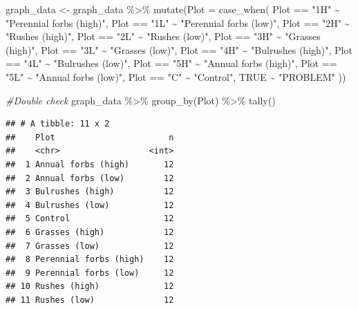 \documentclass[
]{book}
\newenvironment{Shaded}{\begin{snugshade}}{\end{snugshade}}
\newcommand{\AttributeTok}[1]{\textcolor[rgb]{0.77,0.63,0.00}{#1}}
\newcommand{\CommentTok}[1]{\textcolor[rgb]{0.56,0.35,0.01}{\textit{#1}}}
\newcommand{\ConstantTok}[1]{\textcolor[rgb]{0.00,0.00,0.00}{#1}}
\newcommand{\FunctionTok}[1]{\textcolor[rgb]{0.00,0.00,0.00}{#1}}
\newcommand{\NormalTok}[1]{#1}
\newcommand{\OtherTok}[1]{\textcolor[rgb]{0.56,0.35,0.01}{#1}}
\newcommand{\SpecialCharTok}[1]{\textcolor[rgb]{0.00,0.00,0.00}{#1}}
\newcommand{\StringTok}[1]{\textcolor[rgb]{0.31,0.60,0.02}{#1}}
\begin{document}
\begin{Shaded}
\begin{Highlighting}[]
\NormalTok{graph\_data }\OtherTok{\textless{}{-}}\NormalTok{ graph\_data }\SpecialCharTok{\%\textgreater{}\%} 
  \FunctionTok{mutate}\NormalTok{(}\AttributeTok{Plot =} \FunctionTok{case\_when}\NormalTok{(}
\NormalTok{    Plot }\SpecialCharTok{==} \StringTok{"1H"} \SpecialCharTok{\textasciitilde{}} \StringTok{"Perennial forbs (high)"}\NormalTok{,}
\NormalTok{    Plot }\SpecialCharTok{==} \StringTok{"1L"} \SpecialCharTok{\textasciitilde{}} \StringTok{"Perennial forbs (low)"}\NormalTok{,}
\NormalTok{    Plot }\SpecialCharTok{==} \StringTok{"2H"} \SpecialCharTok{\textasciitilde{}} \StringTok{"Rushes (high)"}\NormalTok{,}
\NormalTok{    Plot }\SpecialCharTok{==} \StringTok{"2L"} \SpecialCharTok{\textasciitilde{}} \StringTok{"Rushes (low)"}\NormalTok{,}
\NormalTok{    Plot }\SpecialCharTok{==} \StringTok{"3H"} \SpecialCharTok{\textasciitilde{}} \StringTok{"Grasses (high)"}\NormalTok{,}
\NormalTok{    Plot }\SpecialCharTok{==} \StringTok{"3L"} \SpecialCharTok{\textasciitilde{}} \StringTok{"Grasses (low)"}\NormalTok{,}
\NormalTok{    Plot }\SpecialCharTok{==} \StringTok{"4H"} \SpecialCharTok{\textasciitilde{}} \StringTok{"Bulrushes (high)"}\NormalTok{,}
\NormalTok{    Plot }\SpecialCharTok{==} \StringTok{"4L"} \SpecialCharTok{\textasciitilde{}} \StringTok{"Bulrushes (low)"}\NormalTok{,}
\NormalTok{    Plot }\SpecialCharTok{==} \StringTok{"5H"} \SpecialCharTok{\textasciitilde{}} \StringTok{"Annual forbs (high)"}\NormalTok{,}
\NormalTok{    Plot }\SpecialCharTok{==} \StringTok{"5L"} \SpecialCharTok{\textasciitilde{}} \StringTok{"Annual forbs (low)"}\NormalTok{,}
\NormalTok{    Plot }\SpecialCharTok{==} \StringTok{"C"} \SpecialCharTok{\textasciitilde{}} \StringTok{"Control"}\NormalTok{,}
    \ConstantTok{TRUE} \SpecialCharTok{\textasciitilde{}} \StringTok{"PROBLEM"}
\NormalTok{  ))}

\CommentTok{\#Double check}
\NormalTok{graph\_data }\SpecialCharTok{\%\textgreater{}\%} 
  \FunctionTok{group\_by}\NormalTok{(Plot) }\SpecialCharTok{\%\textgreater{}\%} 
  \FunctionTok{tally}\NormalTok{()}
\end{Highlighting}
\end{Shaded}

\begin{verbatim}
## # A tibble: 11 x 2
##    Plot                       n
##    <chr>                  <int>
##  1 Annual forbs (high)       12
##  2 Annual forbs (low)        12
##  3 Bulrushes (high)          12
##  4 Bulrushes (low)           12
##  5 Control                   12
##  6 Grasses (high)            12
##  7 Grasses (low)             12
##  8 Perennial forbs (high)    12
##  9 Perennial forbs (low)     12
## 10 Rushes (high)             12
## 11 Rushes (low)              12
\end{verbatim}
\end{document}
